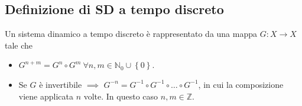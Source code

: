 \subsection{Definizione di SD a tempo discreto}%
\label{sub:Definizione di SD a tempo discreto}
\begin{defn}
    Un sistema dinamico a tempo discreto è rappresentato da una mappa $G: X\to X$ tale che
    \begin{itemize}
        \item $G^{n+m} = G^n \circ G^m \ \forall n, m \in \mathbb{N}_0 \cup \left\{0\right\}$.
	\item Se $G$ è invertibile $\implies$ $G^{-n} = G^{-1}\circ G^{-1} \circ \ldots \circ G^{-1}$, in cui la composizione viene applicata $n$ volte.
	    In questo caso $n, m \in \mathbb{Z}$.
    \end{itemize}
\end{defn}
\noindent

